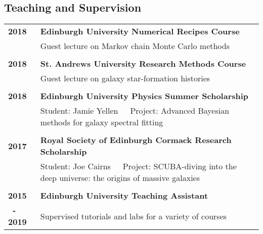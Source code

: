 \documentclass[a4paper,fleqn,usenatbib,onecolumn]{mnras}
\begin{document}
\subsection*{Teaching and Supervision}
\begingroup
\setlength{\tabcolsep}{0pt} %
\renewcommand{\arraystretch}{1.1} %
\begin{longtable}{ p{2cm} p{15cm} }

\bf{2018} & \bf{Edinburgh University Numerical Recipes Course}\\
& Guest lecture on Markov chain Monte Carlo methods\\
\\
\bf{2018} & \bf{St. Andrews University Research Methods Course}\\
& Guest lecture on galaxy star-formation histories\\
\\
\bf{2018} & \bf{Edinburgh University Physics Summer Scholarship}\\
& Student: Jamie Yellen\ \ \ Project: Advanced Bayesian methods for galaxy spectral fitting\\
\\
\bf{2017} & \bf{Royal Society of Edinburgh Cormack Research Scholarship}\\
& Student: Joe Cairns\ \ \ Project: SCUBA-diving into the deep universe: the origins of massive galaxies\\
\\
\bf{2015} & \bf{Edinburgh University Teaching Assistant}\\
\bf{\ - 2019}& Supervised tutorials and labs for a variety of courses\\
\end{longtable}
\endgroup
\end{document}
